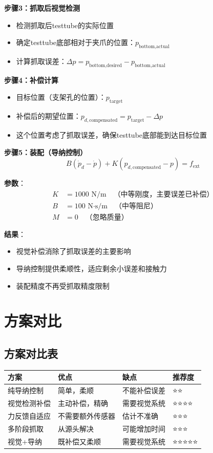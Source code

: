 \documentclass[12pt,a4paper]{article}
\begin{document}
\textbf{步骤3：抓取后视觉检测}
\begin{itemize}
\item 检测抓取后testtube的实际位置
\item 确定testtube底部相对于夹爪的位置：$p_{\text{bottom,actual}}$
\item 计算抓取误差：$\Delta p = p_{\text{bottom,desired}} - p_{\text{bottom,actual}}$
\end{itemize}

\textbf{步骤4：补偿计算}
\begin{itemize}
\item 目标位置（支架孔的位置）：$p_{\text{target}}$
\item 补偿后的期望位置：$p_{d,\text{compensated}} = p_{\text{target}} - \Delta p$
\item 这个位置考虑了抓取误差，确保testtube底部能到达目标位置
\end{itemize}

\textbf{步骤5：装配（导纳控制）}
\begin{equation}
B(\dot{p}_d - \dot{p}) + K(p_{d,\text{compensated}} - p) = f_{\text{ext}}
\end{equation}

\textbf{参数}：
\begin{align}
K &= 1000 \text{ N/m} \quad \text{（中等刚度，主要误差已补偿）} \\
B &= 100 \text{ N·s/m} \quad \text{（中等阻尼）} \\
M &= 0 \quad \text{（忽略质量）}
\end{align}

\textbf{结果}：
\begin{itemize}
\item 视觉补偿消除了抓取误差的主要影响
\item 导纳控制提供柔顺性，适应剩余小误差和接触力
\item 装配精度不再受抓取精度限制
\end{itemize}

\section{方案对比}

\subsection{方案对比表}

\begin{center}
\begin{tabular}{|l|l|l|l|}
\hline
\textbf{方案} & \textbf{优点} & \textbf{缺点} & \textbf{推荐度} \\
\hline
纯导纳控制 & 简单，柔顺 & 不能补偿误差 & ⭐⭐ \\
\hline
视觉检测补偿 & 主动补偿，精确 & 需要视觉系统 & ⭐⭐⭐⭐ \\
\hline
力反馈自适应 & 不需要额外传感器 & 估计不准确 & ⭐⭐⭐ \\
\hline
多阶段抓取 & 从源头解决 & 可能增加时间 & ⭐⭐⭐ \\
\hline
视觉+导纳 & 既补偿又柔顺 & 需要视觉系统 & ⭐⭐⭐⭐⭐ \\
\hline
\end{tabular}
\end{center}
\end{document}
